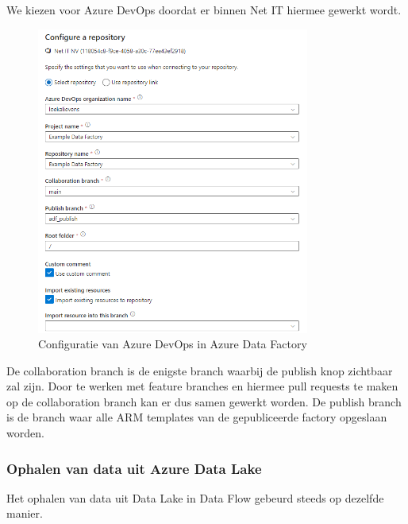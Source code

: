 We kiezen voor Azure DevOps doordat er binnen Net IT hiermee gewerkt wordt.

\begin{figure}[H]
    \centering
    \includegraphics[width=0.8\textwidth]{./graphics/adf/setup_repository_3_specific.png}
    \caption{Configuratie van Azure DevOps in Azure Data Factory}
\end{figure}

De collaboration branch is de enigste branch waarbij de publish knop zichtbaar zal zijn. Door te werken met feature branches en hiermee pull requests te maken op de collaboration branch kan er dus samen gewerkt worden. De publish branch is de branch waar alle ARM templates van de gepubliceerde factory opgeslaan worden.


\subsubsection{Ophalen van data uit Azure Data Lake}

Het ophalen van data uit Data Lake in Data Flow gebeurd steeds op dezelfde manier. 

